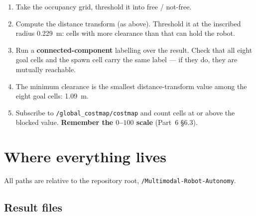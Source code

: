 \documentclass[11pt,a4paper]{report}
\newcommand{\term}[1]{\textcolor{rust}{\textbf{#1}}}
\newcommand{\file}[1]{\texttt{\small #1}}
\begin{document}
\begin{plain}[Procedure]
\begin{enumerate}[leftmargin=1.6em,itemsep=2pt]
\item Take the occupancy grid, threshold it into free / not-free.
\item Compute the distance transform (as above). Threshold it at the inscribed
radius \SI{0.229}{\metre}: cells with more clearance than that can hold the
robot.
\item Run a \term{connected-component} labelling over the result. Check that
all eight goal cells and the spawn cell carry the same label --- if they do,
they are mutually reachable.
\item The minimum clearance is the smallest distance-transform value among the
eight goal cells: \SI{1.09}{\metre}.
\item Subscribe to \file{/global\_costmap/costmap} and count cells at or above
the blocked value. \textbf{Remember the $0$--$100$ scale} (Part~6 \S6.3).
\end{enumerate}
\end{plain}

\chapter{Where everything lives}
\label{ch:files}

All paths are relative to the repository root,
\file{\raisebox{0pt}{\textasciitilde}/Multimodal-Robot-Autonomy}.

\section{Result files}
\end{document}
